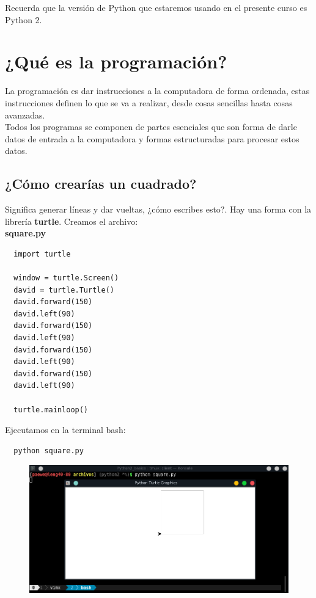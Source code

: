\documentclass{article}
\begin{document}
Recuerda que la versión de Python que estaremos usando en el presente curso es
Python 2.


\section{¿Qué es la programación?}%
La programación es dar instrucciones a la computadora de forma ordenada, estas
instrucciones definen lo que se va a realizar, desde cosas sencillas hasta
cosas avanzadas.\\

Todos los programas se componen de partes esenciales que son forma de darle
datos de entrada a la computadora y formas estructuradas para procesar estos
datos.

\subsection{¿Cómo crearías un cuadrado?}%

Significa generar líneas y dar vueltas, ¿cómo escribes esto?. Hay una forma con
la librería \textbf{turtle}. Creamos el archivo:\\

\textbf{square.py}
\begin{verbatim}
  import turtle

  window = turtle.Screen()
  david = turtle.Turtle()
  david.forward(150)
  david.left(90)
  david.forward(150)
  david.left(90)
  david.forward(150)
  david.left(90)
  david.forward(150)
  david.left(90)

  turtle.mainloop()
\end{verbatim}

Ejecutamos en la terminal bash:

\begin{verbatim}
  python square.py
\end{verbatim}


\begin{figure}[h!]
  \centering
  \includegraphics[scale=0.75]{./Pictures/011_square_turtle.png}
\end{figure}
\end{document}
